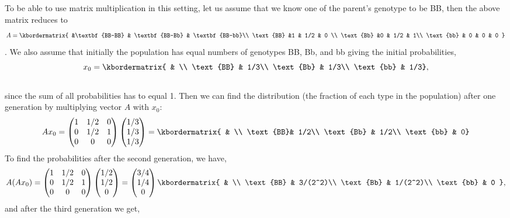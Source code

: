 \documentclass{ximera}
\begin{document}
To be able to use matrix multiplication in this setting, let us assume that we know one of the parent's genotype to be BB, then the above matrix reduces to
\[A= \kbordermatrix{ &\textbf{BB-BB} & \textbf{BB-Bb} & \textbf{BB-bb}\\ 
 \text{BB} &1 & 1/2 & 0 \\
\text{Bb} &0 & 1/2 & 1\\
\text{bb} & 0 & 0 & 0 
}\].
We also assume that initially the population has equal numbers of genotypes BB, Bb, and bb giving the initial probabilities,
\[
x_{0} = \kbordermatrix{ & \\
\text{BB} & 1/3\\
\text{Bb} & 1/3\\
\text{bb} & 1/3},\]\\
since the sum of all probabilities has to equal 1. Then we can find the distribution (the fraction of each type in the population) after one generation by multiplying vector $A$ with $x_{0}$:
\[
Ax_{0} = \begin{pmatrix}1 & 1/2 & 0\\
0 & 1/2 & 1 \\
0 & 0 & 0
\end{pmatrix} \begin{pmatrix}  1/3 \\
1/3\\
1/3
\end{pmatrix}= \kbordermatrix{ & \\
\text{BB}& 1/2\\
\text{Bb} & 1/2\\
\text{bb} & 0}
\]
To find the probabilities after the second generation, we have, 
\[
A(Ax_{0}) = \begin{pmatrix} 1 & 1/2& 0\\
0 & 1/2 & 1 \\
0 & 0 & 0 \end{pmatrix} \begin{pmatrix} 1/2\\
1/2\\
0
\end{pmatrix} = \begin{pmatrix} 3/4\\
1/4\\
0 \end{pmatrix} \kbordermatrix{ & \\
\text{BB} & 3/(2^2)\\
\text{Bb} & 1/(2^2)\\
\text{bb} & 0 },\]
and after the third generation we get,
\end{document}

